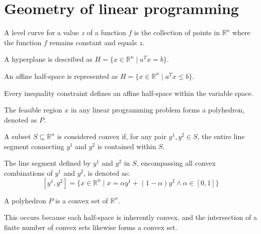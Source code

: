 \section{Geometry of linear programming}

\begin{definition}
    A level curve for a value $z$ of a function $f$ is the collection of points in $\mathbb{R}^n$  where the function $f$ remains constant and equals $z$.
\end{definition}
\begin{definition}
    A hyperplane is described as $H=\{x \in \mathbb{R}^n\mid a^Tx=b\}$. 
\end{definition}
\begin{definition}    
    An affine half-space is represented as $H=\{x \in \mathbb{R}^n\mid a^Tx \leq b\}$. 
\end{definition}
Every inequality constraint defines an affine half-space within the variable space.
\begin{definition}
    The feasible region $x$  in any linear programming problem forms a polyhedron, denoted as $P$. 
\end{definition}
\begin{definition}
    A subset $S \subseteq \mathbb{R}^n$ is considered convex if, for any pair $y^1,y^2 \in S$, the entire line segment connecting $y^1$ and $y^2$ is contained within $S$. 
\end{definition}
\begin{definition}
    The line segment defined by $y^1$ and $y^2 $ in $ S$, encompassing all convex combinations of $y^1$ and $y^2$, is denoted as:
    \[[y^1,y^2]=\{x \in \mathbb{R}^n\mid x=\alpha y^1+(1-\alpha)y^2 \land \alpha \in [0,1]\} \]
\end{definition}
\begin{property}
    A polyhedron $P$ is a convex set of $\mathbb{R}^n$. 
\end{property}
This occurs because each half-space is inherently convex, and the intersection of a finite number of convex sets likewise forms a convex set.

